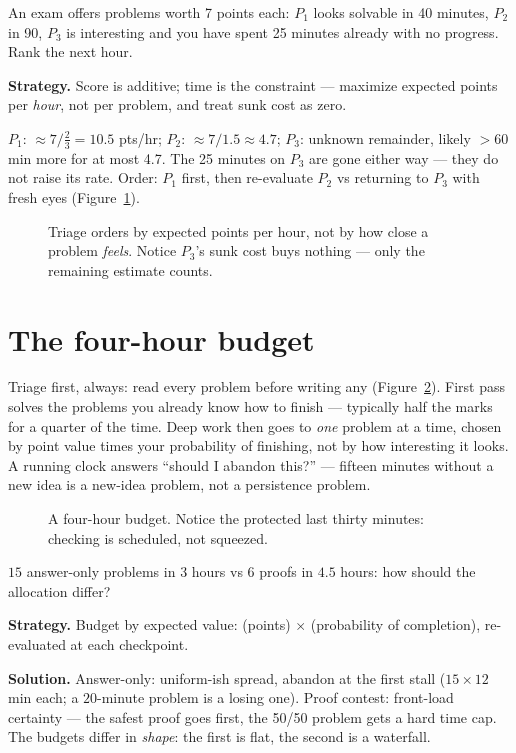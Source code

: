 \begin{example}
An exam offers problems worth 7 points each: $P_1$ looks solvable in
40 minutes, $P_2$ in 90, $P_3$ is interesting and you have spent 25
minutes already with no progress. Rank the next hour.
\par\smallskip
\textbf{Strategy.} Score is additive; time is the constraint ---
maximize expected points per \emph{hour}, not per problem, and treat
sunk cost as zero.
\par\smallskip
\begin{solution}
$P_1$: $\approx 7/\tfrac{2}{3} = 10.5$ pts/hr; $P_2$:
$\approx 7/1.5 \approx 4.7$; $P_3$: unknown remainder, likely $>60$
min more for at most 4.7. The 25 minutes on $P_3$ are gone either way
--- they do not raise its rate. Order: $P_1$ first, then re-evaluate
$P_2$ vs returning to $P_3$ with fresh eyes (Figure~\ref{fig:triage}).
\end{solution}
\end{example}

\begin{figure}[ht]\centering

\caption{Triage orders by expected points per hour, not by how close a
problem \emph{feels}. Notice $P_3$'s sunk cost buys nothing --- only
the remaining estimate counts.}
\label{fig:triage}
\end{figure}

\section{The four-hour budget}
Triage first, always: read every problem before writing any
(Figure~\ref{fig:gantt}). First pass solves the problems you already
know how to finish --- typically half the marks for a quarter of the
time. Deep work then goes to \emph{one} problem at a time, chosen by
point value times your probability of finishing, not by how interesting
it looks. A running clock answers ``should I abandon this?'' ---
fifteen minutes without a new idea is a new-idea problem, not a
persistence problem.
\begin{figure}[ht]\centering

\caption{A four-hour budget. Notice the protected last thirty minutes:
checking is scheduled, not squeezed.}
\label{fig:gantt}
\end{figure}
\begin{example}
$15$ answer-only problems in $3$ hours vs $6$ proofs in $4.5$ hours:
how should the allocation differ?

\textbf{Strategy.} Budget by expected value: (points) $\times$
(probability of completion), re-evaluated at each checkpoint.

\textbf{Solution.} Answer-only: uniform-ish spread, abandon at the
first stall ($15 \times 12$ min each; a $20$-minute problem is a losing
one). Proof contest: front-load certainty --- the safest proof goes
first, the 50/50 problem gets a hard time cap. The budgets differ in
\emph{shape}: the first is flat, the second is a waterfall.
\end{example}

